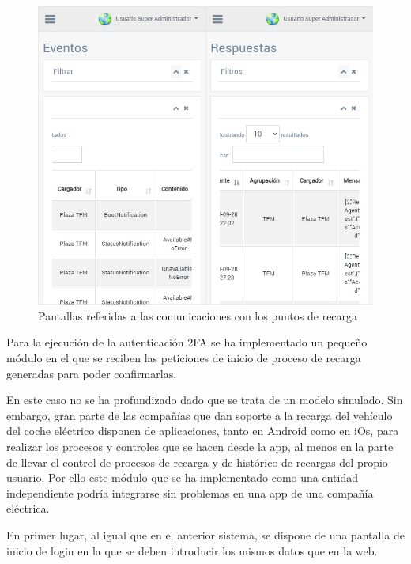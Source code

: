 \documentclass[12pt,a4paper,onecolumn,oneside]{report}
\begin{document}
\begin{figure}[H] 
\centering
  \includegraphics[width=1\textwidth]{figuras/design5.png}
  \caption[Pantallas referidas a las comunicaciones con los puntos de recarga]{Pantallas referidas a las comunicaciones con los puntos de recarga\\
  }
  \label{fig:design5}
\end{figure}

Para la ejecución de la autenticación 2FA se ha implementado un pequeño módulo en el que se reciben las peticiones de inicio de proceso de recarga generadas para poder confirmarlas. 

En este caso no se ha profundizado dado que se trata de un modelo simulado. Sin embargo, gran parte de las compañías que dan soporte a la recarga del vehículo del coche eléctrico disponen de aplicaciones, tanto en Android como en iOs, para realizar los procesos y controles que se hacen desde la app, al menos en la parte de llevar el control de procesos de recarga y de histórico de recargas del propio usuario. Por ello este módulo que se ha implementado como una entidad independiente podría integrarse sin problemas en una app de una compañía eléctrica.

En primer lugar, al igual que en el anterior sistema, se dispone de una pantalla de inicio de login en la que se deben introducir los mismos datos que en la web.
\end{document}
